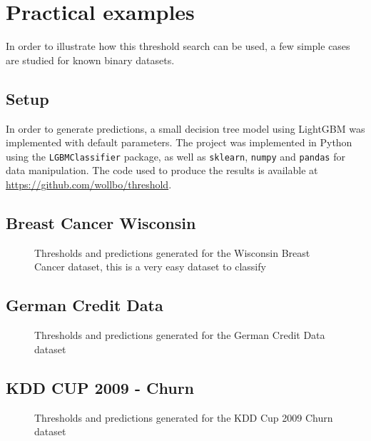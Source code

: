 \documentclass{article}
\begin{document}
\section{Practical examples}
In order to illustrate how this threshold search can be used, a few simple cases are studied for known binary datasets.
\subsection{Setup}
In order to generate predictions, a small decision tree model using LightGBM was implemented with default parameters. The project was implemented in Python using the \texttt{LGBMClassifier} package, as well as \texttt{sklearn}, \texttt{numpy} and \texttt{pandas} for data manipulation. The code used to produce the results is available at \url{https://github.com/wollbo/threshold}.
\subsection{Breast Cancer Wisconsin}
\begin{figure}
    \centering
    \scalebox{.8}{}
    \caption{Thresholds and predictions generated for the Wisconsin Breast Cancer dataset, this is a very easy dataset to classify}
\end{figure}
\subsection{German Credit Data}

\begin{figure}
    \centering
    \scalebox{.8}{}
    \caption{Thresholds and predictions generated for the German Credit Data dataset}
\end{figure}

\subsection{KDD CUP 2009 - Churn}

\begin{figure}
    \centering
    \scalebox{.8}{}
    \caption{Thresholds and predictions generated for the KDD Cup 2009 Churn dataset}
\end{figure}
\end{document}
